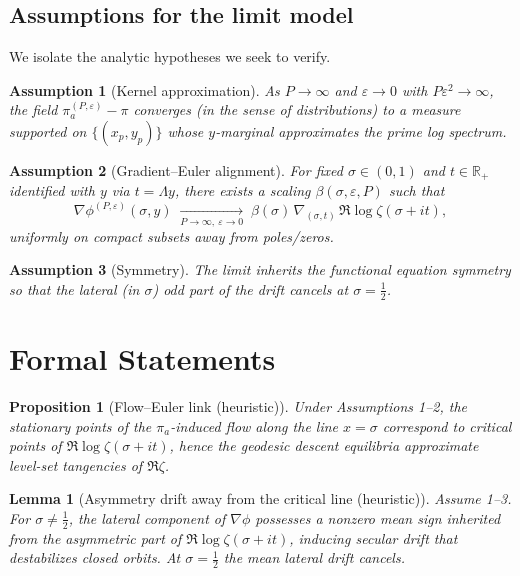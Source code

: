 \documentclass[11pt]{article}
\newtheorem{lemma}{Lemma}
\newtheorem{proposition}{Proposition}
\newtheorem{assumption}{Assumption}
\begin{document}
\subsection*{Assumptions for the limit model}
We isolate the analytic hypotheses we seek to verify.
\begin{assumption}[Kernel approximation]
As $P\to\infty$ and $\varepsilon\to 0$ with $P\varepsilon^2\to\infty$, the field $\pi_a^{(P,\varepsilon)}-\pi$ converges (in the sense of distributions) to a measure supported on $\{(x_p,y_p)\}$ whose $y$-marginal approximates the prime log spectrum.
\end{assumption}
\begin{assumption}[Gradient--Euler alignment]
For fixed $\sigma\in(0,1)$ and $t\in\mathbb{R}_+$ identified with $y$ via $t=\Lambda y$, there exists a scaling $\beta(\sigma,\varepsilon,P)$ such that
\begin{equation}
\nabla\phi^{(P,\varepsilon)}(\sigma,y) \;\xrightarrow[P\to\infty,\ \varepsilon\to 0]{}\; \beta(\sigma)\,\nabla_{(\sigma,t)}\,\Re\log\zeta(\sigma+it),
\end{equation}
uniformly on compact subsets away from poles/zeros.
\end{assumption}
\begin{assumption}[Symmetry]
The limit inherits the functional equation symmetry so that the lateral (in $\sigma$) odd part of the drift cancels at $\sigma=\tfrac12$.
\end{assumption}

\section{Formal Statements}
\begin{proposition}[Flow--Euler link (heuristic)]
Under Assumptions 1--2, the stationary points of the $\pi_a$-induced flow along the line $x=\sigma$ correspond to critical points of $\Re\log\zeta(\sigma+it)$, hence the geodesic descent equilibria approximate level-set tangencies of $\Re\zeta$.
\end{proposition}

\begin{lemma}[Asymmetry drift away from the critical line (heuristic)]
Assume 1--3. For $\sigma\neq \tfrac12$, the lateral component of $\nabla\phi$ possesses a nonzero mean sign inherited from the asymmetric part of $\Re\log\zeta(\sigma+it)$, inducing secular drift that destabilizes closed orbits. At $\sigma=\tfrac12$ the mean lateral drift cancels.
\end{lemma}
\end{document}
